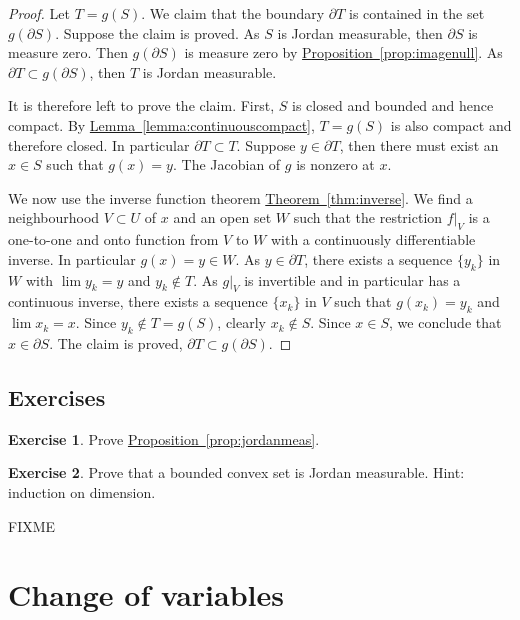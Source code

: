 \documentclass[12pt]{book}
\newcommand{\sectionnewpage}{\clearpage}
\theoremstyle{plain}
\theoremstyle{remark}
\theoremstyle{definition}
\theoremstyle{exercise}
\newtheorem{exercise}{Exercise}[section]
\theoremstyle{example}
\newcommand{\thmref}[1]{\hyperref[#1]{Theorem~\ref*{#1}}}
\newcommand{\propref}[1]{\hyperref[#1]{Proposition~\ref*{#1}}}
\newcommand{\lemmaref}[1]{\hyperref[#1]{Lemma~\ref*{#1}}}
\begin{document}
\begin{proof}
Let $T = g(S)$.
We claim that the boundary $\partial T$ is contained in the
set $g(\partial S)$.  Suppose the claim is proved.
As $S$ is Jordan measurable, then
$\partial S$ is measure zero.  Then  $g(\partial S)$ is measure
zero by \propref{prop:imagenull}.  As $\partial T \subset g(\partial
S)$, then $T$ is Jordan measurable.

It is therefore left to prove the claim.  First, $S$ is closed and bounded
and hence compact.  By \lemmaref{lemma:continuouscompact}, $T = g(S)$ is
also compact and therefore closed.  In particular $\partial T \subset T$.
Suppose $y \in \partial T$, then there must exist an
$x \in S$
such that $g(x) = y$.  The Jacobian of $g$ is nonzero at $x$.

We now use the inverse function theorem \thmref{thm:inverse}.  We find 
a neighbourhood $V \subset U$ of $x$ and an open set $W$ such that
the restriction $f|_V$ is a one-to-one and onto function from $V$ to $W$
with a continuously differentiable inverse.  In particular $g(x) = y \in W$.
As $y \in \partial T$, there exists a sequence $\{ y_k \}$ in $W$ with
$\lim y_k = y$ and $y_k \notin T$.  As $g|_V$ is invertible and in
particular has a continuous inverse, there exists
a sequence $\{ x_k \}$ in $V$ such that $g(x_k) = y_k$ and $\lim x_k = x$.
Since $y_k \notin T = g(S)$, clearly $x_k \notin S$.  Since $x \in S$, we
conclude that $x \in \partial S$.  The claim is proved, $\partial T \subset
g(\partial S)$.
\end{proof}

\subsection{Exercises}

\begin{exercise}
Prove \propref{prop:jordanmeas}.
\end{exercise}

\begin{exercise}
Prove that a bounded convex set is Jordan measurable.  Hint: induction on
dimension.
\end{exercise}

FIXME


\sectionnewpage
\section{Change of variables}
\label{sec:mvchangeofvars}
\end{document}
